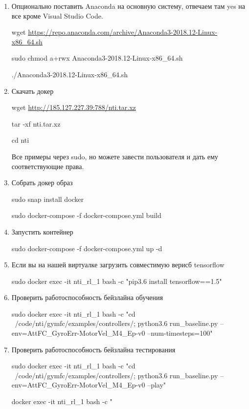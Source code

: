 \begin{enumerate}
    \item Опционально поставить Anaconda на основную систему, отвечаем там yes на все кроме Visual Studio Code.
    
    wget \url{https://repo.anaconda.com/archive/Anaconda3-2018.12-Linux-x86_64.sh}
    
    sudo chmod a+rwx Anaconda3-2018.12-Linux-x86\_64.sh
    
    ./Anaconda3-2018.12-Linux-x86\_64.sh
    
    \item Скачать докер
    
    wget \url{http://185.127.227.39:788/nti.tar.xz}

    tar -xf nti.tar.xz

    cd nti

    Все примеры через sudo, но можете завести пользователя и дать ему соответствующие права.

    \item Собрать докер образ
    
    sudo snap install docker

    sudo docker-compose  -f docker-compose.yml build

    \item Запустить контейнер

    sudo docker-compose -f docker-compose.yml up -d 

    \item Если вы на нашей виртуалке загрузить совместимую верисб tensorflow

    sudo docker exec -it nti\_rl\_1 bash -c "pip3.6 install tensorflow==1.5"
    
    \item Проверить работоспособность бейзлайна обучения

    sudo docker exec -it nti\_rl\_1 bash -c "cd ~/code/nti/gymfc/examples/controllers/; python3.6 run\_baseline.py --env=AttFC\_GyroErr-MotorVel\_M4\_Ep-v0 --num-timesteps=100"  

    \item Проверить работоспособность бейзлайна тестирования

    sudo docker exec -it nti\_rl\_1 bash -c "cd ~/code/nti/gymfc/examples/controllers/; python3.6 run\_baseline.py --env=AttFC\_GyroErr-MotorVel\_M4\_Ep-v0 --play"
    
    docker exec -it nti\_rl\_1 bash -c "
    
\end{enumerate}

